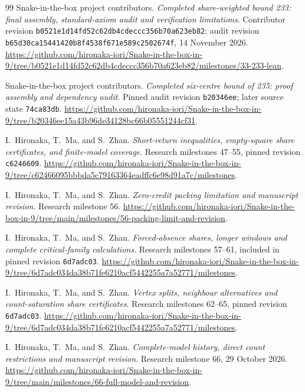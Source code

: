 \documentclass[11pt,a4paper]{article}
\theoremstyle{definition}
\theoremstyle{remark}
\begin{document}
\begin{thebibliography}{99}
Snake-in-the-box project contributors. \emph{Completed share-weighted bound
233: final assembly, standard-axiom audit and verification limitations}.
Contributor revision \texttt{b0521e1d14fd52c62db4cdeccc356b70a623eb82};
audit revision \texttt{b65d30ca15441420b8f4538f671e589c2502674f},
14 November 2026.
\url{https://github.com/hironaka-iori/Snake-in-the-box-in-9/tree/b0521e1d14fd52c62db4cdeccc356b70a623eb82/milestones/33-233-lean}.

Snake-in-the-box project contributors. \emph{Completed six-centre bound of 235: proof assembly and dependency audit}. Pinned audit revision \texttt{b20346ee}; later source state \texttt{74ca83db}.
\url{https://github.com/hironaka-iori/Snake-in-the-box-in-9/tree/b20346ee15a43b96de34128bc66b05551244cf31}.

I.~Hironaka, T.~Ma, and S.~Zhan. \emph{Short-return inequalities, empty-square share certificates, and finite-model coverage}. Research milestones 47--55, pinned revision \texttt{c6246609}.
\url{https://github.com/hironaka-iori/Snake-in-the-box-in-9/tree/c62466095bbbda5c79163364eadffc6e98d91a7c/milestones}.

I.~Hironaka, T.~Ma, and S.~Zhan. \emph{Zero-credit packing limitation and manuscript revision}. Research milestone 56.
\url{https://github.com/hironaka-iori/Snake-in-the-box-in-9/tree/main/milestones/56-packing-limit-and-revision}.

I.~Hironaka, T.~Ma, and S.~Zhan. \emph{Forced-absence shares, longer windows and complete critical-family calculations}. Research milestones 57--61, included in pinned revision \texttt{6d7adc03}.
\url{https://github.com/hironaka-iori/Snake-in-the-box-in-9/tree/6d7adc034da38b71fe6210acf5442255a7a52771/milestones}.

I.~Hironaka, T.~Ma, and S.~Zhan. \emph{Vertex splits, neighbour alternatives and count-saturation share certificates}. Research milestones 62--65, pinned revision \texttt{6d7adc03}.
\url{https://github.com/hironaka-iori/Snake-in-the-box-in-9/tree/6d7adc034da38b71fe6210acf5442255a7a52771/milestones}.

I.~Hironaka, T.~Ma, and S.~Zhan. \emph{Complete-model history, direct count restrictions and manuscript revision}. Research milestone 66, 29 October 2026.
\url{https://github.com/hironaka-iori/Snake-in-the-box-in-9/tree/main/milestones/66-full-model-and-revision}.


\end{thebibliography}
\end{document}
